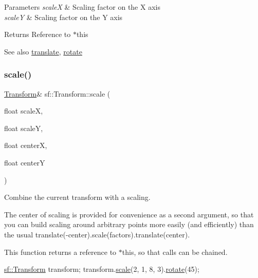 \begin{DoxyParams}{Parameters}
{\em scaleX} & Scaling factor on the X axis \\
\hline
{\em scaleY} & Scaling factor on the Y axis\\
\hline
\end{DoxyParams}
\begin{DoxyReturn}{Returns}
Reference to $\ast$this
\end{DoxyReturn}
\begin{DoxySeeAlso}{See also}
\hyperlink{classsf_1_1_transform_ab54f6c8070cc05e2afcb3145fbf4395a}{translate}, \hyperlink{classsf_1_1_transform_a3e548c3c9e3fb9d4bd43cf852669e555}{rotate} 
\end{DoxySeeAlso}
\mbox{\label{classsf_1_1_transform_a6eaeedd35e289cb17f9bf7f24dc28daa}} 
\subsubsection{\texorpdfstring{scale()}{scale()}\hspace{0.1cm}{\footnotesize\ttfamily [2/4]}}
{\footnotesize\ttfamily \hyperlink{classsf_1_1_transform}{Transform}\& sf\+::\+Transform\+::scale (\begin{DoxyParamCaption}\item[{float}]{scaleX,  }\item[{float}]{scaleY,  }\item[{float}]{centerX,  }\item[{float}]{centerY }\end{DoxyParamCaption})}



Combine the current transform with a scaling. 

The center of scaling is provided for convenience as a second argument, so that you can build scaling around arbitrary points more easily (and efficiently) than the usual translate(-\/center).scale(factors).translate(center).

This function returns a reference to $\ast$this, so that calls can be chained. 
\begin{DoxyCode}
\hyperlink{classsf_1_1_transform}{sf::Transform} transform;
transform.\hyperlink{classsf_1_1_transform_a3f46af807f69d74120fb836334268671}{scale}(2, 1, 8, 3).\hyperlink{classsf_1_1_transform_a3e548c3c9e3fb9d4bd43cf852669e555}{rotate}(45);
\end{DoxyCode}



